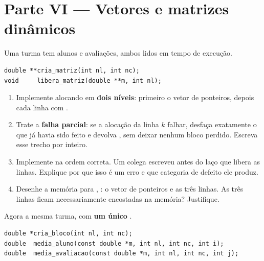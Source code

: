 \documentclass[11pt,a4paper]{article}
\begin{document}
\section{Parte VI --- Vetores e matrizes dinâmicos}

Uma turma tem  alunos e  avaliações, ambos lidos em tempo de execução.

\begin{lstlisting}
double **cria_matriz(int nl, int nc);
void     libera_matriz(double **m, int nl);
\end{lstlisting}

\begin{enumerate}[label=(\alph*),leftmargin=1.8em,itemsep=1pt]
  \item Implemente  alocando em \textbf{dois níveis}: primeiro o vetor
        de  ponteiros, depois cada linha com  .
  \item Trate a \textbf{falha parcial}: se a alocação da linha $k$ falhar, desfaça
        exatamente o que já havia sido feito e devolva , sem deixar nenhum
        bloco perdido. Escreva esse trecho por inteiro.
  \item Implemente  na ordem correta. Um colega escreveu
         antes do laço que libera as linhas. Explique por que isso é um
        erro e que categoria de defeito ele produz.
  \item Desenhe a memória para , : o vetor de ponteiros e as três
        linhas. As três linhas ficam necessariamente encostadas na memória?
        Justifique.
\end{enumerate}

Agora a mesma turma, com \textbf{um único} .

\begin{lstlisting}
double *cria_bloco(int nl, int nc);
double  media_aluno(const double *m, int nl, int nc, int i);
double  media_avaliacao(const double *m, int nl, int nc, int j);
\end{lstlisting}
\end{document}
